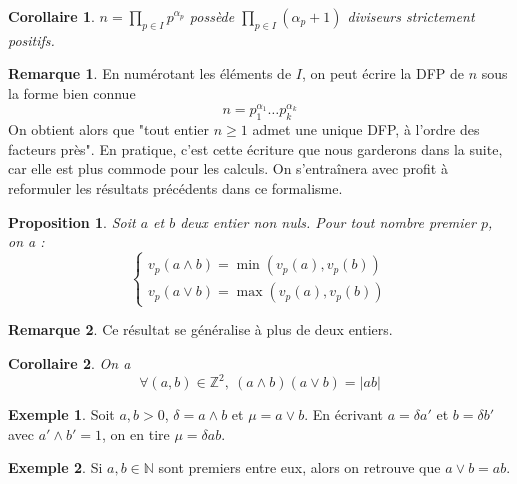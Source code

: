 \documentclass[french]{book}
\newcommand{\N}{\mathbb{N}}
\newcommand{\Z}{\mathbb{Z}}
\theoremstyle{plain}
\newtheorem{prop}{Proposition}[chapter]
\newtheorem{cor}{Corollaire}[chapter]
\theoremstyle{definition}
\newtheorem{exa}{Exemple}[chapter]
\newtheorem{rmq}{Remarque}[chapter]
\theoremstyle{remark}
\begin{document}
\begin{cor}
	$\displaystyle n=\prod_{p\in I}p^{\alpha_p}$ possède $\displaystyle\prod_{p\in I}(\alpha_p+1)$ diviseurs strictement positifs.
\end{cor}
\begin{rmq}
	En numérotant les éléments de $I$, on peut écrire la DFP de $n$ sous la forme bien connue $$n=p_1^{\alpha_1}\ldots p_k^{\alpha_k}$$ On obtient alors que "tout entier $n\geqslant1$ admet une unique DFP, à l'ordre des facteurs près". En pratique, c'est cette écriture que nous garderons dans la suite, car elle est plus commode pour les calculs. On s'entraînera avec profit à reformuler les résultats précédents dans ce formalisme.
\end{rmq}
\begin{prop}
	Soit $a$ et $b$ deux entier non nuls. Pour tout nombre premier $p$, on a : $$\left \{\begin{array}{ll}v_p(a\wedge b)=\min(v_p(a),v_p(b)) \\ v_p(a\vee b)=\max(v_p(a),v_p(b))\end{array}\right.$$
\end{prop}
\begin{rmq}
	Ce résultat se généralise à plus de deux entiers.
\end{rmq}
\begin{cor}
	On a $$\forall(a,b)\in\Z^2,\ (a\wedge b)(a\vee b)=\lvert ab\rvert$$
\end{cor}
\begin{exa}
	Soit $a,b>0$, $\delta=a\wedge b$ et $\mu=a\vee b$. En écrivant $a=\delta a'$ et $b=\delta b'$ avec $a'\wedge b'=1$, on en tire $\mu=\delta ab$.
\end{exa}
\begin{exa}
	Si $a,b\in\N$ sont premiers entre eux, alors on retrouve que $a\vee b=ab$.
\end{exa}
\end{document}
